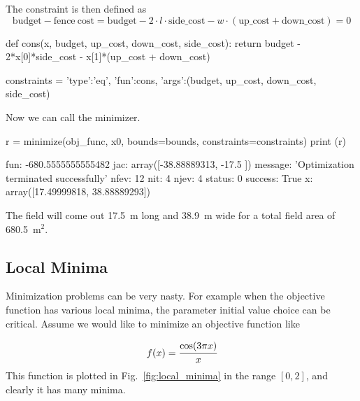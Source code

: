 The constraint is then defined as
\begin{equation*}
\mathrm{budget} - \mathrm{fence~cost} = \mathrm{budget} - 2\cdot l\cdot\mathrm{side\_cost} - w\cdot(\mathrm{up\_cost} + \mathrm{down\_cost}) = 0
\end{equation*}

\begin{ipython}
def cons(x, budget, up_cost, down_cost, side_cost):
    return budget - 2*x[0]*side_cost - x[1]*(up_cost + down_cost)

constraints = {'type':'eq', 'fun':cons,
               'args':(budget, up_cost, down_cost, side_cost)}
\end{ipython}

Now we can call the minimizer.

\begin{ipython}
r = minimize(obj_func, x0, bounds=bounds, constraints=constraints)
print (r)
\end{ipython}
\begin{ioutput}
    fun: -680.5555555555482
    jac: array([-38.88889313, -17.5       ])
message: 'Optimization terminated successfully'
   nfev: 12
    nit: 4  
   njev: 4
 status: 0
success: True
      x: array([17.49999818, 38.88889293])
\end{ioutput}

The field will come out 17.5~m long and 38.9~m wide for a total field area of 680.5~$\textrm{m}^2$.

\subsection{Local Minima}
Minimization problems can be very nasty.
For example when the objective function has various local minima, the parameter initial value choice can be critical. 
Assume we would like to minimize an objective function like 

\begin{equation*}
f(x) = \cfrac{\mathrm{cos}(3\pi x)}{x}
\end{equation*}
This function is plotted in Fig.~\ref{fig:local_minima} in the range $[0, 2]$, and clearly it has many minima. 

